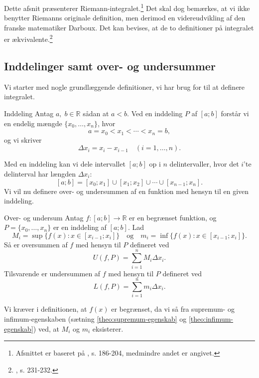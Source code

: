 Dette afsnit præsenterer Riemann-integralet.\footnote{Afsnittet er baseret på \cite{Abbott2002}, s. 186-204, medmindre andet er angivet.}
Det skal dog bemærkes, at vi ikke benytter Riemanns originale definition, men derimod en videreudvikling af den franske matematiker Darboux.
Det kan bevises, at de to definitioner på integralet er ækvivalente.\footnote{\cite{Bartle2010}, s. 231-232.}

\subsection{Inddelinger samt over- og undersummer}%
  \label{sub:Inddelinger samt over- og undersummer}

Vi starter med nogle grundlæggende definitioner, vi har brug for til at definere integralet.
\begin{definition}[label=def:inddeling]{Inddeling}{}
  Antag $a,\;b \in \mathbb{R}$ sådan at $a <b$.
  Ved en inddeling $P$ af $[a;b]$ forstår vi en endelig mængde $\{x_0,\dotsc, x_n\}$, hvor
  \[
  a=x_0<x_1<\cdots<x_n=b,
  \] 
  og vi skriver 
  \[
  \Delta x_i=x_i-x_{i-1} \quad (i=1,\ldots ,n).
  \]  
\end{definition}
Med en inddeling kan vi dele intervallet $[a;b]$ op i $n$ delintervaller, hvor det $i$'te delinterval har længden $\Delta x_i$:
\[
[a;b]=[x_0;x_1] \cup [x_1;x_2]\cup \cdots \cup [x _{n-1};x_n].
\] 
Vi vil nu definere over- og undersummen af en funktion med hensyn til en given inddeling.

\begin{definition}[label=def:oversum]{Over- og undersum}{}
  Antag $f:[a;b] \to \mathbb{R}$ er en begrænset funktion, og $P=\{x_0,\ldots, x_n\}$ er en inddeling af $[a;b]$. 
  Lad 
  \[
  M_i=\sup \{ f(x):x \in [x _{i-1};x_i] \} \quad{\text{og}} \quad m_i=\inf \{ f(x):x \in [x _{i-1};x_i] \}.
  \] 
  Så er oversummen af $f$ med hensyn til $P$ defineret ved
  \[
  U(f, P)=\sum_{i=1}^{n} M_i \Delta x_i.
  \] 
  Tilsvarende er undersummen af $f$ med hensyn til $P$ defineret ved
  \[
  L(f, P)=\sum_{i=1}^{n} m_i \Delta x_i.
  \] 
\end{definition}

Vi kræver i definitionen, at $f(x)$ er begrænset, da vi så fra supremum- og infimum-egenskaben (sætning \ref{theo:supremum-egenskab} og \ref{theo:infimum-egenskab}) ved, at $M_i$ og $m_i$ eksisterer. 

